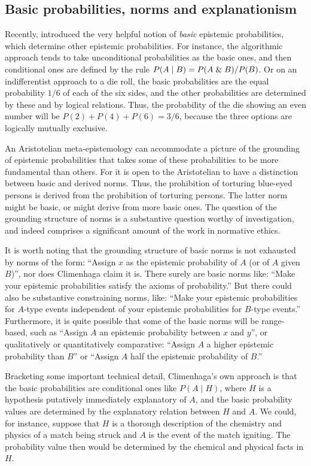 \subsection{Basic probabilities, norms and explanationism}
Recently,  introduced the 
very helpful notion 
of \textit{basic} epistemic probabilities, which determine other epistemic probabilities. For instance, the 
algorithmic approach tends to take unconditional probabilities as the basic ones, and then conditional ones are 
defined by the rule $P(A\mid B)=P(A\mathrel{\&} B)/P(B)$. Or on an indifferentist approach to a die roll, the basic 
probabilities are the equal probability $1/6$ of each of the six sides, and the other probabilities are determined
by these and by logical relations. Thus, the probability of the die showing an even number will be $P(2)+P(4)+P(6)=3/6$,
because the three options are logically mutually exclusive. 

An Aristotelian meta-epistemology can accommodate a picture of the grounding of epistemic probabilities that 
takes some of these probabilities to be more fundamental than others. For it is open to the Aristotelian to have
a distinction between basic and derived norms. Thus, the prohibition of torturing blue-eyed persons is 
derived from the prohibition of torturing persons. The latter norm might be basic, or might derive from 
more basic ones. The question of the grounding structure of norms is a substantive question worthy of 
investigation, and indeed comprises a significant amount of the work in normative ethics. 

It is worth noting that the grounding structure of basic norms is not exhausted by norms of the form:
``Assign $x$ as the epistemic probability of $A$ (or of $A$ given $B$)'', nor does Climenhaga claim it is.
There surely are basic norms like: ``Make your epistemic probabilities satisfy the axioms of probability.''
But there could also be substantive constraining norms, like: ``Make your epistemic probabilities for $A$-type 
events independent of your epistemic probabilities for $B$-type events.'' Furthermore, it is quite possible
that some of the basic norms will be range-based, such as ``Assign $A$ an epistemic probability between $x$ 
and $y$'', or qualitatively or quantitatively comparative: ``Assign $A$ a higher epistemic probability than
$B$'' or ``Assign $A$ half the epistemic probability of $B$.''

Bracketing some important technical detail, Climenhaga's own approach is that the basic probabilities are conditional 
ones like $P(A\mid H)$, where $H$ is a hypothesis putatively immediately explanatory of $A$, and the basic 
probability values are determined by the explanatory relation between $H$ and $A$. We could, for instance, 
suppose that $H$ is a thorough description of the chemistry and physics of a match being struck and $A$ 
is the event of the match igniting. The probability value then would be determined by the chemical and physical facts 
in $H$.

